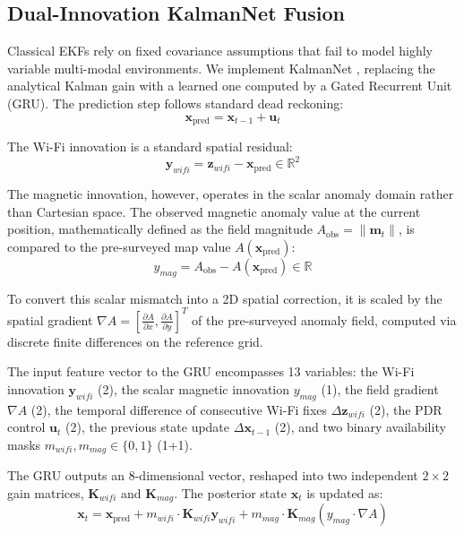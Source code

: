 \documentclass[conference]{IEEEtran}
\begin{document}
\subsection{Dual-Innovation KalmanNet Fusion}\label{sec:kalmannet}

Classical EKFs rely on fixed covariance assumptions that fail to model highly variable multi-modal environments. We implement KalmanNet \cite{kalmannet}, replacing the analytical Kalman gain with a learned one computed by a Gated Recurrent Unit (GRU). The prediction step follows standard dead reckoning:
\begin{equation}
\mathbf{x}_{\text{pred}} = \mathbf{x}_{t-1} + \mathbf{u}_t \label{eq:kn_predict}
\end{equation}

The Wi-Fi innovation is a standard spatial residual:
\begin{equation}
\mathbf{y}_{wifi} = \mathbf{z}_{wifi} - \mathbf{x}_{\text{pred}} \in \mathbb{R}^2 \label{eq:kn_innovate_w}
\end{equation}

The magnetic innovation, however, operates in the scalar anomaly domain rather than Cartesian space. The observed magnetic anomaly value at the current position, mathematically defined as the field magnitude $A_{\text{obs}} = \|\mathbf{m}_t\|$, is compared to the pre-surveyed map value $A(\mathbf{x}_{\text{pred}})$:
\begin{equation}
y_{mag} = A_{\text{obs}} - A(\mathbf{x}_{\text{pred}}) \in \mathbb{R} \label{eq:kn_innovate_m}
\end{equation}

To convert this scalar mismatch into a 2D spatial correction, it is scaled by the spatial gradient $\nabla A = [\frac{\partial A}{\partial x}, \frac{\partial A}{\partial y}]^T$ of the pre-surveyed anomaly field, computed via discrete finite differences on the reference grid.

The input feature vector to the GRU encompasses 13 variables: the Wi-Fi innovation $\mathbf{y}_{wifi}$ (2), the scalar magnetic innovation $y_{mag}$ (1), the field gradient $\nabla A$ (2), the temporal difference of consecutive Wi-Fi fixes $\Delta \mathbf{z}_{wifi}$ (2), the PDR control $\mathbf{u}_t$ (2), the previous state update $\Delta \mathbf{x}_{t-1}$ (2), and two binary availability masks $m_{wifi}, m_{mag} \in \{0, 1\}$ (1+1).

The GRU outputs an 8-dimensional vector, reshaped into two independent $2\!\times\!2$ gain matrices, $\mathbf{K}_{wifi}$ and $\mathbf{K}_{mag}$. The posterior state $\mathbf{x}_t$ is updated as:
\begin{equation}
\mathbf{x}_t = \mathbf{x}_{\text{pred}} + m_{wifi} \cdot \mathbf{K}_{wifi} \mathbf{y}_{wifi} + m_{mag} \cdot \mathbf{K}_{mag} (y_{mag} \cdot \nabla A) \label{eq:kn_correct}
\end{equation}
\end{document}
